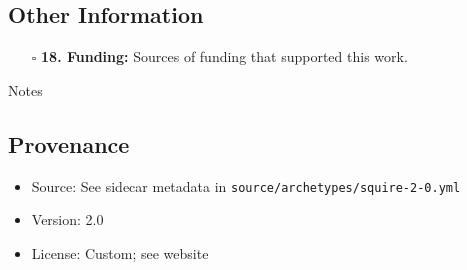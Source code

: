 \documentclass[11pt]{article}
\def\tightlist{}
\begin{document}
\begin{Form}
\subsection{Other Information}\label{other-information}

\begin{itemize}
\tightlist
\item[$\square$]
  \textbf{18. Funding:} Sources of funding that supported this work.
\end{itemize}

{Notes}

\subsection{Provenance}\label{provenance}

\begin{itemize}
\tightlist
\item
  Source: See sidecar metadata in
  \texttt{source/archetypes/squire-2-0.yml}
\item
  Version: 2.0
\item
  License: Custom; see website
\end{itemize}

\end{Form}
\end{document}
